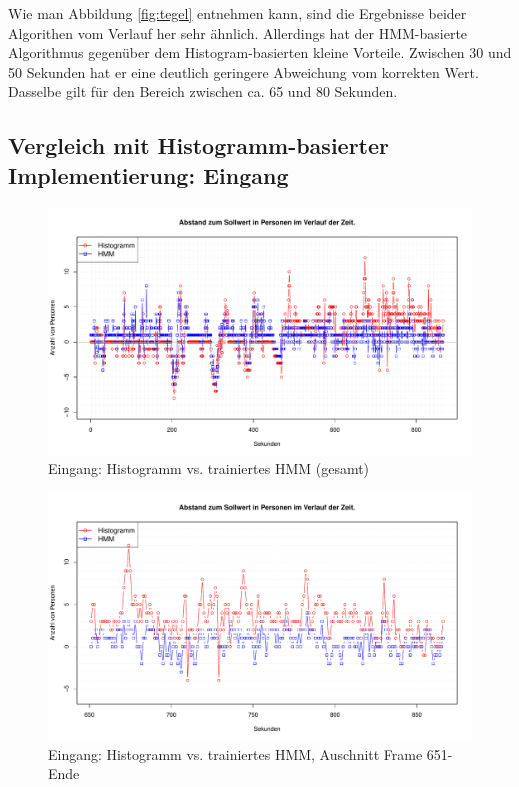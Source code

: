 Wie man Abbildung \ref{fig:tegel} entnehmen kann, sind die Ergebnisse beider Algorithen vom Verlauf her sehr ähnlich.
Allerdings hat der HMM-basierte Algorithmus gegenüber dem Histogram-basierten kleine Vorteile.
Zwischen 30 und 50 Sekunden hat er eine deutlich geringere Abweichung vom korrekten Wert.
Dasselbe gilt für den Bereich zwischen ca. 65 und 80 Sekunden.\\

\subsection{Vergleich mit Histogramm-basierter Implementierung: Eingang}
\label{sec:eval_eingang}
\begin{figure}
	\centering
\includegraphics[width=1\textwidth]{bilder/eingang2_histo_vs_hmm_prelearned.pdf}
\caption{Eingang: Histogramm vs. trainiertes HMM (gesamt)}
	\label{fig:Eingang-gesamt}
\end{figure}
\begin{figure}
	\centering
	\includegraphics[width=1\textwidth]{bilder/safest_plot_histo_vs_prelearned_652-end.pdf}
	\caption{Eingang: Histogramm vs. trainiertes HMM, Auschnitt Frame 651-Ende}
	\label{fig:Eingang-teil}
\end{figure}
